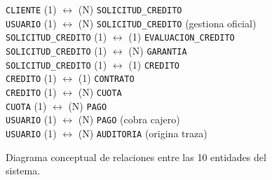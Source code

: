 \documentclass[11pt,letterpaper]{report}
\begin{document}
\begin{figure}[htbp]
\centering
\begin{tcolorbox}[colback=white,colframe=bankSecondary,title=Mapa de Relaciones Relacionales (Modelo ER)]
\small
\texttt{CLIENTE} (1) $\longleftrightarrow$ (N) \texttt{SOLICITUD\_CREDITO}\\
\texttt{USUARIO} (1) $\longleftrightarrow$ (N) \texttt{SOLICITUD\_CREDITO} (gestiona oficial)\\
\texttt{SOLICITUD\_CREDITO} (1) $\longleftrightarrow$ (1) \texttt{EVALUACION\_CREDITO}\\
\texttt{SOLICITUD\_CREDITO} (1) $\longleftrightarrow$ (N) \texttt{GARANTIA}\\
\texttt{SOLICITUD\_CREDITO} (1) $\longleftrightarrow$ (1) \texttt{CREDITO}\\
\texttt{CREDITO} (1) $\longleftrightarrow$ (1) \texttt{CONTRATO}\\
\texttt{CREDITO} (1) $\longleftrightarrow$ (N) \texttt{CUOTA}\\
\texttt{CUOTA} (1) $\longleftrightarrow$ (N) \texttt{PAGO}\\
\texttt{USUARIO} (1) $\longleftrightarrow$ (N) \texttt{PAGO} (cobra cajero)\\
\texttt{USUARIO} (1) $\longleftrightarrow$ (N) \texttt{AUDITORIA} (origina traza)
\end{tcolorbox}
\caption{Diagrama conceptual de relaciones entre las 10 entidades del sistema.}
\end{figure}
\end{document}
